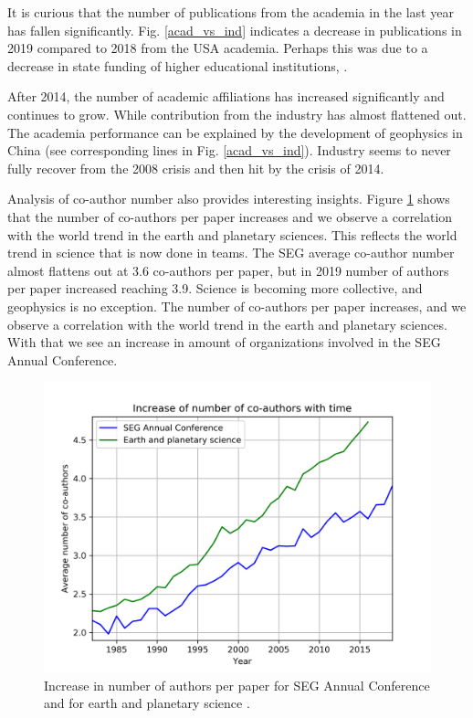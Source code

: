\documentclass[geosciences,article,submit,moreauthors,pdftex]{Definitions/mdpi}
\begin{document}
It is curious that the number of publications from the academia in the last year has fallen significantly. Fig. \ref{acad_vs_ind} indicates a decrease in publications in 2019 compared to 2018 from the USA academia. Perhaps this was due to a decrease in state funding of higher educational institutions, \citep{Brownstein2018}.

After 2014, the number of academic affiliations has increased significantly and continues to grow.  While contribution from the industry has almost flattened out. The academia performance can be explained by the development of geophysics in China (see corresponding lines in Fig. \ref{acad_vs_ind}).  Industry seems to never fully recover from the 2008 crisis and then hit by the crisis of 2014.

Analysis of co-author number also provides interesting insights. Figure \ref{co_auth} shows that the number of co-authors per paper increases and we observe a correlation with the world trend in the earth and planetary sciences. This reflects the world trend in science that is now done in teams. The SEG average co-author number almost flattens out at 3.6 co-authors per paper, but in 2019 number of authors per paper increased reaching 3.9. Science is becoming more collective, and geophysics is no exception. The number of co-authors per paper increases, and we observe a correlation with the world trend in the earth and planetary sciences. With that we see an increase in amount of organizations involved in the SEG Annual Conference.


\begin{figure}[ht!]
\centering
\includegraphics[scale=0.7]{co_auth.png}
\caption{Increase in number of authors per paper for SEG Annual Conference and for earth and planetary science \citep{Mallapaty2018}.}
\label{co_auth}
\end{figure}
\end{document}
